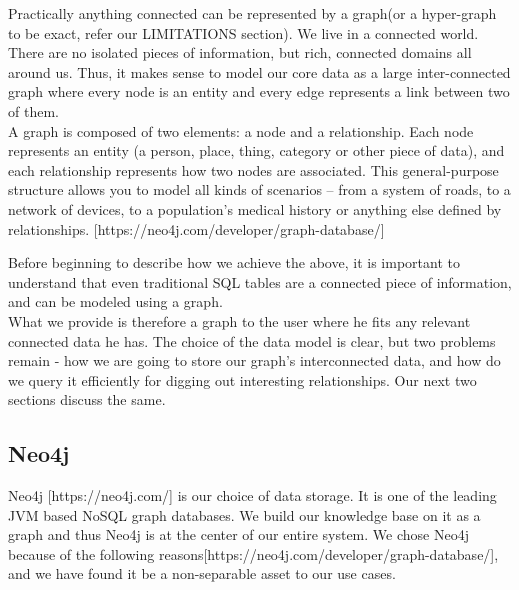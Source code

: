 Practically anything connected can be represented by a graph(or a hyper-graph to be exact, refer our LIMITATIONS section). We live in a connected world. There are no isolated pieces of information, but rich, connected domains all around us. Thus, it makes sense to model our core data as a large inter-connected graph where every node is an entity and every edge represents a link between two of them.   \\


A graph is composed of two elements: a node and a relationship. Each node represents an entity (a person, place, thing, category or other piece of data), and each relationship represents how two nodes are associated. This general-purpose structure allows you to model all kinds of scenarios – from a system of roads, to a network of devices, to a population’s medical history or anything else defined by relationships. [https://neo4j.com/developer/graph-database/]

Before beginning to describe how we achieve the above, it is important to understand that even traditional SQL tables are a connected piece of information, and can be modeled using a graph. \\

What we provide is therefore a graph to the user where he fits any relevant connected data he has. The choice of the data model is clear, but two problems remain - how we are going to store our graph's interconnected data, and how do we query it efficiently for digging out interesting relationships. Our next two sections discuss the same. \\

\subsection{Neo4j}

Neo4j [https://neo4j.com/] is our choice of data storage. It is one of the leading JVM based NoSQL graph databases. We build our knowledge base on it as a graph and thus Neo4j is at the center of our entire system. We chose Neo4j because of the following reasons[https://neo4j.com/developer/graph-database/], and we have found it be a non-separable asset to our use cases. \\

